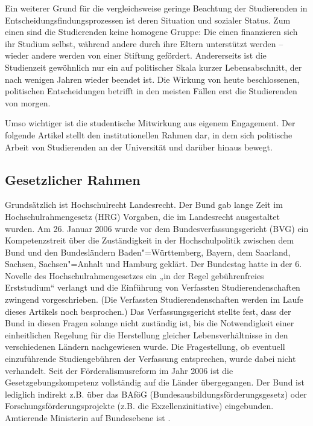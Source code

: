Ein weiterer Grund für die vergleichsweise geringe Beachtung der
Studierenden in Entscheidungsfindungsprozessen ist deren Situation und
sozialer Status. Zum einen sind die Studierenden keine homogene Gruppe:
Die einen finanzieren sich ihr Studium selbst, während andere durch ihre
Eltern unterstützt werden -- wieder andere werden von
einer Stiftung gefördert. Andererseits ist die Studienzeit gewöhnlich nur
ein auf politischer Skala kurzer Lebensabschnitt, der nach wenigen Jahren
wieder beendet ist. Die Wirkung von heute beschlossenen, politischen
Entscheidungen betrifft in den meisten Fällen erst die Studierenden von
morgen.

Umso wichtiger ist die studentische Mitwirkung aus eigenem Engagement. Der
folgende Artikel stellt den institutionellen Rahmen dar, in dem sich
politische Arbeit von Studierenden an der Universität und darüber hinaus
bewegt.

\subsection{Gesetzlicher Rahmen}
Grundsätzlich ist Hochschulrecht Landesrecht. Der Bund gab lange Zeit im
Hochschulrahmengesetz (HRG) Vorgaben, die im Landesrecht ausgestaltet
wurden. Am 26. Januar 2006 wurde vor dem Bundesverfassungsgericht (BVG)
ein Kompetenzstreit über die Zuständigkeit in der Hochschulpolitik
zwischen dem Bund und den Bundesländern Baden"=Württemberg, Bayern, dem
Saarland, Sachsen, Sachsen"=Anhalt und Hamburg geklärt. Der Bundestag hatte
in der 6. Novelle des Hochschulrahmengesetzes ein „in der Regel
gebührenfreies Erststudium“ verlangt und die Einführung von Verfassten
Studierendenschaften zwingend vorgeschrieben. (Die Verfassten
Studierendenschaften werden im Laufe dieses Artikels noch besprochen.) Das
Verfassungsgericht stellte fest, dass der Bund in diesen Fragen solange
nicht zuständig ist, bis die Notwendigkeit einer einheitlichen Regelung
für die Herstellung gleicher Lebensverhältnisse in den verschiedenen
Ländern nachgewiesen wurde. Die Fragestellung, ob eventuell einzuführende
Studiengebühren der Verfassung entsprechen, wurde dabei nicht verhandelt.
Seit der Förderalismusreform im Jahr 2006 ist die Gesetzgebungskompetenz
vollständig auf die Länder übergegangen. Der Bund ist lediglich indirekt
z.B. über das BAföG (Bundesausbildungsförderungsgesetz) oder
Forschungsförderungsprojekte (z.B. die Exzellenzinitiative) eingebunden.
Amtierende Ministerin auf Bundesebene ist \wissenschaftsministerbund.


